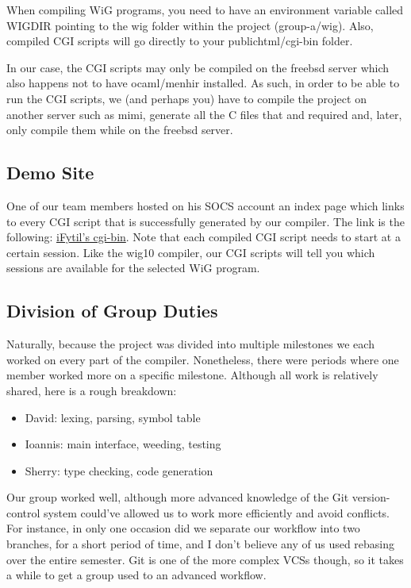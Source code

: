\documentclass{WigReport}
\begin{document}
When compiling WiG programs, you need to have an environment variable called WIGDIR pointing to the wig folder within the project (group-a/wig). Also, compiled CGI scripts will go directly to your public\textunderscore html/cgi-bin folder. 

In our case, the CGI scripts may only be compiled on the freebsd server which also happens not to have ocaml/menhir installed. As such, in order to be able to run the CGI scripts, we (and perhaps you) have to compile the project on another server such as mimi, generate all the C files that and required and, later, only compile them while on the freebsd server. 

\subsection{Demo Site}
One of our team members hosted on his SOCS account an index page which links to every CGI script that is successfully generated by our compiler. The link is the following: \href{http://www.cs.mcgill.ca/~ifytil/cgi-bin/}{iFytil's cgi-bin}. Note that each compiled CGI script needs to start at a certain session. Like the wig10 compiler, our CGI scripts will tell you which sessions are available for the selected WiG program.

\subsection{Division of Group Duties}
Naturally, because the project was divided into multiple milestones we each worked on every part of the compiler. Nonetheless, there were periods where one member worked more on a specific milestone. Although all work is relatively shared, here is a rough breakdown:
\begin{itemize}
\item David: lexing, parsing, symbol table
\item Ioannis: main interface, weeding, testing
\item Sherry: type checking, code generation
\end{itemize}

Our group worked well, although more advanced knowledge of the Git version-control system could've allowed us to work more efficiently and avoid conflicts. For instance, in only one occasion did we separate our workflow into two branches, for a short period of time, and I don't believe any of us used rebasing over the entire semester. Git is one of the more complex VCSs though, so it takes a while to get a group used to an advanced workflow. 
\end{document}
